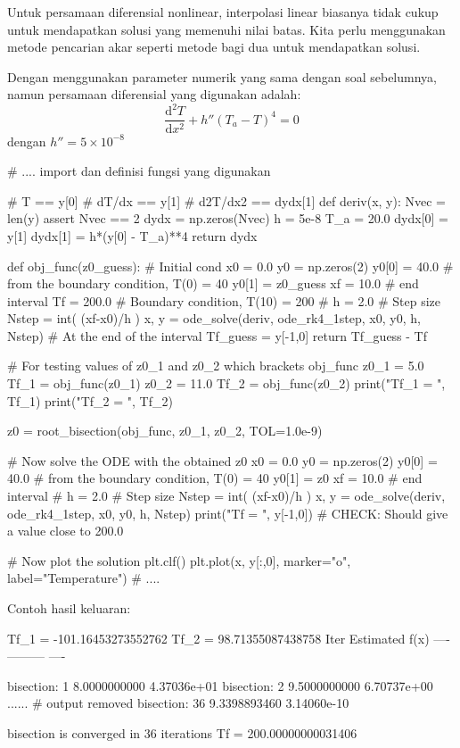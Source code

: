 Untuk persamaan diferensial nonlinear, interpolasi linear biasanya
tidak cukup untuk mendapatkan solusi yang memenuhi nilai batas.
Kita perlu menggunakan metode pencarian akar seperti metode bagi
dua untuk mendapatkan solusi.

\begin{soal}
Dengan menggunakan parameter numerik yang sama dengan soal sebelumnya, namun
persamaan diferensial yang digunakan adalah:
\begin{equation*}
\frac{\mathrm{d}^2 T}{\mathrm{d}x^2} + h''(T_a - T)^4 = 0
\end{equation*}
dengan $h'' = 5\times 10^{-8}$
\end{soal}


\begin{pythoncode}
# .... import dan definisi fungsi yang digunakan

# T == y[0]
# dT/dx == y[1]
# d2T/dx2 == dydx[1]
def deriv(x, y):
    Nvec = len(y)
    assert Nvec == 2
    dydx = np.zeros(Nvec)
    h = 5e-8
    T_a = 20.0
    dydx[0] = y[1]
    dydx[1] = h*(y[0] - T_a)**4
    return dydx

def obj_func(z0_guess):
    # Initial cond
    x0 = 0.0
    y0 = np.zeros(2)
    y0[0] = 40.0 # from the boundary condition, T(0) = 40
    y0[1] = z0_guess
    xf = 10.0  # end interval
    Tf = 200.0 # Boundary condition, T(10) = 200
    #
    h = 2.0 # Step size
    Nstep = int( (xf-x0)/h )
    x, y = ode_solve(deriv, ode_rk4_1step, x0, y0, h, Nstep)
    # At the end of the interval
    Tf_guess = y[-1,0]
    return Tf_guess - Tf


# For testing values of z0_1 and z0_2 which brackets obj_func
z0_1 = 5.0
Tf_1 = obj_func(z0_1)
z0_2 = 11.0
Tf_2 = obj_func(z0_2)
print("Tf_1 = ", Tf_1)
print("Tf_2 = ", Tf_2)

z0 = root_bisection(obj_func, z0_1, z0_2, TOL=1.0e-9)

# Now solve the ODE with the obtained z0
x0 = 0.0
y0 = np.zeros(2)
y0[0] = 40.0 # from the boundary condition, T(0) = 40
y0[1] = z0
xf = 10.0  # end interval
#
h = 2.0 # Step size
Nstep = int( (xf-x0)/h )
x, y = ode_solve(deriv, ode_rk4_1step, x0, y0, h, Nstep)
print("Tf = ", y[-1,0])  # CHECK: Should give a value close to 200.0

# Now plot the solution
plt.clf()
plt.plot(x, y[:,0], marker="o", label="Temperature")
# ....
\end{pythoncode}


Contoh hasil keluaran:
\begin{textcode}
Tf_1 =  -101.16453273552762
Tf_2 =  98.71355087438758
             Iter      Estimated          f(x)
             ----      ---------          ----

bisection:     1       8.0000000000     4.37036e+01
bisection:     2       9.5000000000     6.70737e+00
......  # output removed
bisection:    36       9.3398893460     3.14060e-10

bisection is converged in 36 iterations
Tf =  200.00000000031406
\end{textcode}



